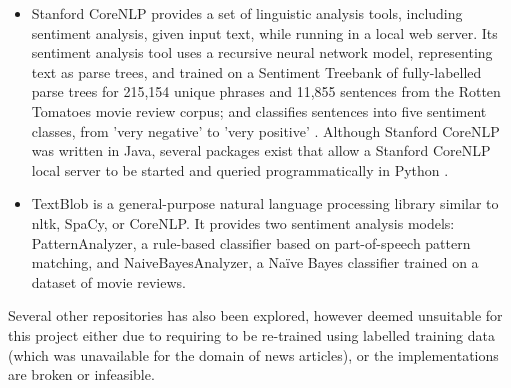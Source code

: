 \documentclass{report}
\begin{document}
\begin{itemize}
	\item Stanford CoreNLP \cite{StanfordNLP} provides a set of linguistic analysis tools, including sentiment analysis, given input text, while running in a local web server.
		Its sentiment analysis tool uses a recursive neural network model, representing text as parse trees, and trained on a Sentiment Treebank of fully-labelled parse trees for 215,154 unique phrases and 11,855 sentences from the Rotten Tomatoes movie review corpus; and classifies sentences into five sentiment classes, from 'very negative' to 'very positive' \cite{socher2013recursive}.
		Although Stanford CoreNLP was written in Java, several packages exist that allow a Stanford CoreNLP local server to be started and queried programmatically in Python \cite{stanfordcorenlp}.
	\item TextBlob is a general-purpose natural language processing library similar to nltk, SpaCy, or CoreNLP.
		It provides two sentiment analysis models: PatternAnalyzer, a rule-based classifier based on part-of-speech pattern matching, and NaiveBayesAnalyzer, a Na\"{i}ve Bayes classifier trained on a dataset of movie reviews. \cite{textblob}
\end{itemize}
Several other repositories has also been explored, however deemed unsuitable for this project either due to requiring to be re-trained using labelled training data (which was unavailable for the domain of news articles), or the implementations are broken or infeasible.
\end{document}
